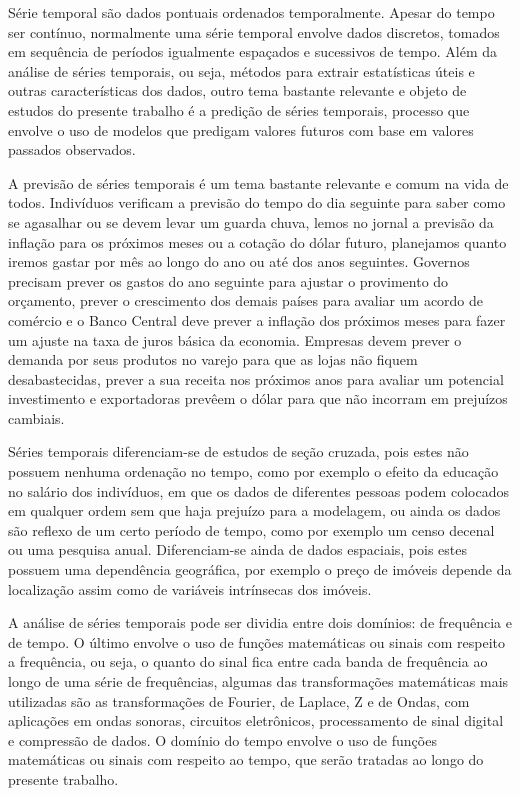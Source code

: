 \documentclass[twocolumn]{rbef}
\newcommand{\1}{\mathbbm{1}}
\begin{document}
Série temporal são dados pontuais ordenados temporalmente. Apesar do tempo ser contínuo, normalmente uma série temporal envolve dados discretos, tomados em sequência de períodos igualmente espaçados e sucessivos de tempo. Além da análise de séries temporais, ou seja, métodos para extrair estatísticas úteis e outras características dos dados, outro tema bastante relevante e objeto de estudos do presente trabalho é a predição de séries temporais, processo que envolve o uso de modelos que predigam valores futuros com base em valores passados observados.

A previsão de séries temporais é um tema bastante relevante e comum na vida de todos. Indivíduos verificam a previsão do tempo do dia seguinte para saber como se agasalhar ou se devem levar um guarda chuva, lemos no jornal a previsão da inflação para os próximos meses ou a cotação do dólar futuro, planejamos quanto iremos gastar por mês ao longo do ano ou até dos anos seguintes. Governos precisam prever os gastos do ano seguinte para ajustar o provimento do orçamento, prever o crescimento dos demais países para avaliar um acordo de comércio e o Banco Central deve prever a inflação dos próximos meses para fazer um ajuste na taxa de juros básica da economia. Empresas devem prever o demanda por seus produtos no varejo para que as lojas não fiquem desabastecidas, prever a sua receita nos próximos anos para avaliar um potencial investimento e exportadoras prevêem o dólar para que não incorram em prejuízos cambiais.

Séries temporais diferenciam-se de estudos de seção cruzada, pois estes não possuem nenhuma ordenação no tempo, como por exemplo o efeito da educação no salário dos indivíduos, em que os dados de diferentes pessoas podem colocados em qualquer ordem sem que haja prejuízo para a modelagem, ou ainda os dados são reflexo de um certo período de tempo, como por exemplo um censo decenal ou uma pesquisa anual. Diferenciam-se ainda de dados espaciais, pois estes possuem uma dependência geográfica, por exemplo o preço de imóveis depende da localização assim como de variáveis intrínsecas dos imóveis.

A análise de séries temporais pode ser dividia entre dois domínios: de frequência e de tempo. O último envolve o uso de funções matemáticas  ou sinais com respeito a frequência, ou seja, o quanto do sinal fica entre cada banda de frequência ao longo de uma série de frequências, algumas das transformações matemáticas mais utilizadas são as transformações de Fourier, de Laplace, Z e de Ondas, com aplicações em ondas sonoras, circuitos eletrônicos, processamento de sinal digital e compressão de dados. O domínio do tempo envolve o uso de funções matemáticas ou sinais com respeito ao tempo, que serão tratadas ao longo do presente trabalho.
\end{document}
